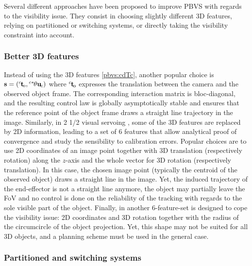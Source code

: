 \documentclass[letterpaper, 10 pt, conference]{IEEEtran}  %
\begin{document}
Several different approaches have been proposed to improve PBVS with regards to the visibility issue.
They consist in choosing slightly different 3D features, relying on partitioned or switching systems, or directly taking the visibility constraint into account.

\subsubsection{Better 3D features}
Instead of using the 3D features \eqref{pbvs:cdTc}, another popular choice is $\s=(\Transl{c}{o},\ThetaU{c*}{c})$ where $\Transl{c}{o}$ expresses the translation between the camera and the observed object frame. The corresponding interaction matrix is bloc-diagonal, and the resulting control law is globally asymptotically stable and ensures that the reference point of the object frame draws a straight line trajectory in the image.
Similarly, in 2 1/2 visual servoing \cite{1999_itra_malis}, some of the 3D features are replaced by 2D information, leading to a set of 6 features that allow analytical proof of convergence and study the sensibility to calibration errors.
Popular choices are to use 2D coordinates of an image point together with 3D translation (respectively rotation) along the $z$-axis and the whole vector for 3D rotation (respectively translation). In this case, the chosen image point (typically the centroid of the observed object) draws a straight line in the image.
Yet, the induced trajectory of the end-effector is not a straight line anymore, the object may partially leave the FoV and no control is done on the reliability of the tracking with regards to the sole visible part of the object.
Finally, in \cite{morel2000explicit} another 6-feature-set is designed to cope the visibility issue: 2D coordinates and 3D rotation together with the radius of the circumcircle of the object projection.
Yet, this shape may not be suited for all 3D objects, and a planning scheme must be used in the general case.

\subsubsection{Partitioned and switching systems}
\end{document}
